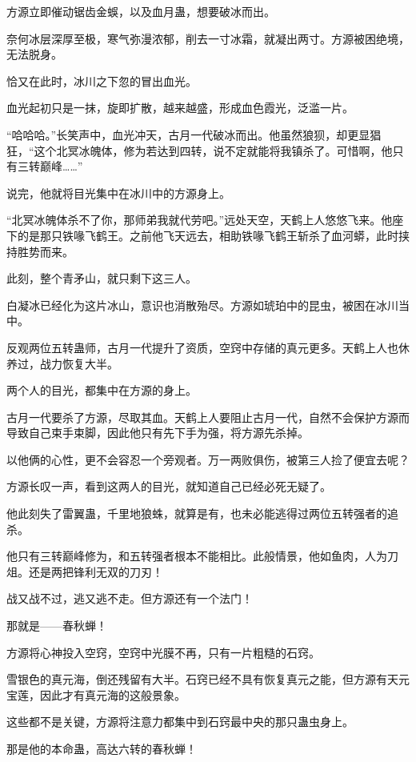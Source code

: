 
\begin{this_body}

方源立即催动锯齿金蜈，以及血月蛊，想要破冰而出。

奈何冰层深厚至极，寒气弥漫浓郁，削去一寸冰霜，就凝出两寸。方源被困绝境，无法脱身。

恰又在此时，冰川之下忽的冒出血光。

血光起初只是一抹，旋即扩散，越来越盛，形成血色霞光，泛滥一片。

“哈哈哈。”长笑声中，血光冲天，古月一代破冰而出。他虽然狼狈，却更显猖狂，“这个北冥冰魄体，修为若达到四转，说不定就能将我镇杀了。可惜啊，他只有三转巅峰……”

说完，他就将目光集中在冰川中的方源身上。

“北冥冰魄体杀不了你，那师弟我就代劳吧。”远处天空，天鹤上人悠悠飞来。他座下的是那只铁喙飞鹤王。之前他飞天远去，相助铁喙飞鹤王斩杀了血河蟒，此时挟持胜势而来。

此刻，整个青矛山，就只剩下这三人。

白凝冰已经化为这片冰山，意识也消散殆尽。方源如琥珀中的昆虫，被困在冰川当中。

反观两位五转蛊师，古月一代提升了资质，空窍中存储的真元更多。天鹤上人也休养过，战力恢复大半。

两个人的目光，都集中在方源的身上。

古月一代要杀了方源，尽取其血。天鹤上人要阻止古月一代，自然不会保护方源而导致自己束手束脚，因此他只有先下手为强，将方源先杀掉。

以他俩的心性，更不会容忍一个旁观者。万一两败俱伤，被第三人捡了便宜去呢？

方源长叹一声，看到这两人的目光，就知道自己已经必死无疑了。

他此刻失了雷翼蛊，千里地狼蛛，就算是有，也未必能逃得过两位五转强者的追杀。

他只有三转巅峰修为，和五转强者根本不能相比。此般情景，他如鱼肉，人为刀俎。还是两把锋利无双的刀刃！

战又战不过，逃又逃不走。但方源还有一个法门！

那就是——春秋蝉！

方源将心神投入空窍，空窍中光膜不再，只有一片粗糙的石窍。

雪银色的真元海，倒还残留有大半。石窍已经不具有恢复真元之能，但方源有天元宝莲，因此才有真元海的这般景象。

这些都不是关键，方源将注意力都集中到石窍最中央的那只蛊虫身上。

那是他的本命蛊，高达六转的春秋蝉！


\end{this_body}
